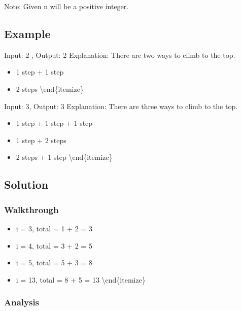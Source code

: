 \documentclass[]{book}
\providecommand{\tightlist}{%
  \setlength{\itemsep}{0pt}\setlength{\parskip}{0pt}}
\begin{document}
Note: Given n will be a positive integer.

\hypertarget{example-30}{%
\subsection{Example}\label{example-30}}

Input: 2 , Output: 2
Explanation: There are two ways to climb to the top.

\begin{itemize}
\tightlist
\item
  1 step + 1 step
\item
  2 steps
  \textbackslash{}end\{itemize\}
\end{itemize}

Input: 3, Output: 3
Explanation: There are three ways to climb to the top.

\begin{itemize}
\tightlist
\item
  1 step + 1 step + 1 step
\item
  1 step + 2 steps
\item
  2 steps + 1 step
  \textbackslash{}end\{itemize\}
\end{itemize}

\hypertarget{solution-24}{%
\subsection{Solution}\label{solution-24}}

\hypertarget{walkthrough-30}{%
\subsubsection{Walkthrough}\label{walkthrough-30}}

\begin{itemize}
\tightlist
\item
  i = 3, total = 1 + 2 = 3
\item
  i = 4, total = 3 + 2 = 5
\item
  i = 5, total = 5 + 3 = 8
\item
  i = 13, total = 8 + 5 = 13
  \textbackslash{}end\{itemize\}
\end{itemize}

\hypertarget{analysis-33}{%
\subsubsection{Analysis}\label{analysis-33}}
\end{document}
